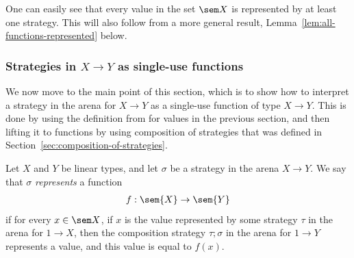One can easily see that every value in the set $\sem X$ is represented by at least one strategy. This will also follow from a more general result, Lemma~\ref{lem:all-functions-represented} below.

\subsubsection{Strategies in $X \to Y$ as single-use functions}
We now move to the main point of this section, which is to show how to interpret a strategy in the arena for $X \to Y$ as a single-use function of type $X \to Y$. This is done by using the definition from for values in the previous section, and then lifting it to functions by using composition of strategies that was defined in Section~\ref{sec:composition-of-strategies}.


\begin{definition}\label{def:strategy-as-single-use-function}
    Let $X$ and $Y$ be linear types, and let $\sigma$ be a strategy in the arena $X \to Y$. We say that $\sigma$ \emph{represents} a function  
    \begin{align*}
    f : \sem{X} \to \sem{Y}
    \end{align*}
    if for every $x \in \sem X$, if  $x$ is the value  represented by some strategy $\tau$ in the arena for $1 \to X$, then the composition strategy $\tau;\sigma$ in the arena for $1 \to Y$ represents a value, and this value is equal to $f(x)$.
\end{definition}

